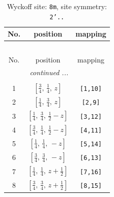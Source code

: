 \documentclass[fleqn,8pt]{jsarticle}
\begin{document}
\begin{longtable}{ccc}
\caption{Wyckoff site: {\tt 8m}, site symmetry: {\tt 2'..}}
 \\
 \hline \hline
No. & position & mapping \\ \hline \endfirsthead

\multicolumn{2}{l}{\tablename\ \thetable{}} \\
 \hline \hline
No. & position & mapping \\ \hline \endhead

 \hline \hline
\multicolumn{2}{r}{\footnotesize\it continued ...} \\ \endfoot

 \hline \hline
\multicolumn{2}{r}{} \\ \endlastfoot

1 & $\left[ \frac{3}{4},\, \frac{1}{4},\, z \right]$ & {\tt [1,10]} \\ \hline
2 & $\left[ \frac{1}{4},\, \frac{3}{4},\, z \right]$ & {\tt [2,9]} \\ \hline
3 & $\left[ \frac{1}{4},\, \frac{3}{4},\, \frac{1}{2} - z \right]$ & {\tt [3,12]} \\ \hline
4 & $\left[ \frac{3}{4},\, \frac{1}{4},\, \frac{1}{2} - z \right]$ & {\tt [4,11]} \\ \hline
5 & $\left[ \frac{1}{4},\, \frac{1}{4},\, - z \right]$ & {\tt [5,14]} \\ \hline
6 & $\left[ \frac{3}{4},\, \frac{3}{4},\, - z \right]$ & {\tt [6,13]} \\ \hline
7 & $\left[ \frac{1}{4},\, \frac{1}{4},\, z + \frac{1}{2} \right]$ & {\tt [7,16]} \\ \hline
8 & $\left[ \frac{3}{4},\, \frac{3}{4},\, z + \frac{1}{2} \right]$ & {\tt [8,15]} \\
\end{longtable}
\renewcommand{\arraystretch}{1.2}
\end{document}
